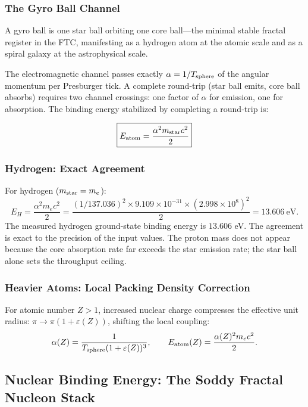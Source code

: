 \documentclass[11pt,a4paper]{article}
\begin{document}
\subsubsection{The Gyro Ball Channel}

A gyro ball is one star ball orbiting one core ball---the minimal stable fractal register in the FTC, manifesting as a hydrogen atom at the atomic scale and as a spiral galaxy at the astrophysical scale.

The electromagnetic channel passes exactly $\alpha = 1/T_{\rm sphere}$ of the angular momentum per Presburger tick. A complete round-trip (star ball emits, core ball absorbs) requires two channel crossings: one factor of $\alpha$ for emission, one for absorption. The binding energy stabilized by completing a round-trip is:

\begin{equation}
\boxed{E_{\rm atom} = \frac{\alpha^2 m_{\rm star} c^2}{2}}
\label{eq:atom_base}
\end{equation}

\subsubsection{Hydrogen: Exact Agreement}

For hydrogen ($m_{\rm star} = m_e$):
\[
E_H = \frac{\alpha^2 m_e c^2}{2}
    = \frac{(1/137.036)^2 \times 9.109\times10^{-31}
      \times (2.998\times10^8)^2}{2}
    = 13.606\ \text{eV}.
\]
The measured hydrogen ground-state binding energy is $13.606$ eV. The agreement is exact to the precision of the input values. The proton mass does not appear because the core absorption rate far exceeds the star emission rate; the star ball alone sets the throughput ceiling.

\subsubsection{Heavier Atoms: Local Packing Density Correction}

For atomic number $Z > 1$, increased nuclear charge compresses the effective unit radius: $\pi \to \pi(1 + \varepsilon(Z))$, shifting the local coupling:
\[
\alpha(Z) = \frac{1}{T_{\rm sphere}(1+\varepsilon(Z))^3},
\qquad
E_{\rm atom}(Z) = \frac{\alpha(Z)^2 m_e c^2}{2}.
\]

\subsection{Nuclear Binding Energy: The Soddy Fractal Nucleon Stack}
\end{document}

